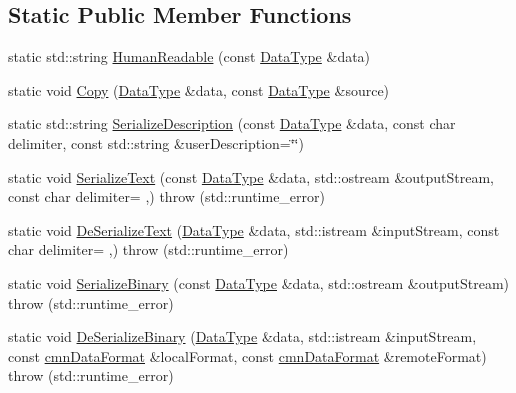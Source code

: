 \subsection*{Static Public Member Functions}
\begin{DoxyCompactItemize}
\item 
static std\+::string \hyperlink{classcmn_data_a486363e19d02f447104d14d3b9dcf2fa}{Human\+Readable} (const \hyperlink{classcmn_data_a353bd6bb0af651b6301e5e2e34587da2}{Data\+Type} \&data)
\item 
static void \hyperlink{classcmn_data_a0fcd362f10c5b31cf289f4fcd7ad3ea2}{Copy} (\hyperlink{classcmn_data_a353bd6bb0af651b6301e5e2e34587da2}{Data\+Type} \&data, const \hyperlink{classcmn_data_a353bd6bb0af651b6301e5e2e34587da2}{Data\+Type} \&source)
\item 
static std\+::string \hyperlink{classcmn_data_a31e9cd60cd1ff6ea665db60d90e3fbe1}{Serialize\+Description} (const \hyperlink{classcmn_data_a353bd6bb0af651b6301e5e2e34587da2}{Data\+Type} \&data, const char delimiter, const std\+::string \&user\+Description=\char`\"{}\char`\"{})
\item 
static void \hyperlink{classcmn_data_ad2b3503564e579511c78aaa891f864f5}{Serialize\+Text} (const \hyperlink{classcmn_data_a353bd6bb0af651b6301e5e2e34587da2}{Data\+Type} \&data, std\+::ostream \&output\+Stream, const char delimiter= \textquotesingle{},\textquotesingle{})  throw (std\+::runtime\+\_\+error)
\item 
static void \hyperlink{classcmn_data_a7daf61ca319d4f7835a856fb45741ef2}{De\+Serialize\+Text} (\hyperlink{classcmn_data_a353bd6bb0af651b6301e5e2e34587da2}{Data\+Type} \&data, std\+::istream \&input\+Stream, const char delimiter= \textquotesingle{},\textquotesingle{})  throw (std\+::runtime\+\_\+error)
\item 
static void \hyperlink{classcmn_data_a0b625171f6eb752525fb8c6cac5206f0}{Serialize\+Binary} (const \hyperlink{classcmn_data_a353bd6bb0af651b6301e5e2e34587da2}{Data\+Type} \&data, std\+::ostream \&output\+Stream)  throw (std\+::runtime\+\_\+error)
\item 
static void \hyperlink{classcmn_data_a26db3364e7ccd6296cc833c8ce060be1}{De\+Serialize\+Binary} (\hyperlink{classcmn_data_a353bd6bb0af651b6301e5e2e34587da2}{Data\+Type} \&data, std\+::istream \&input\+Stream, const \hyperlink{classcmn_data_format}{cmn\+Data\+Format} \&local\+Format, const \hyperlink{classcmn_data_format}{cmn\+Data\+Format} \&remote\+Format)  throw (std\+::runtime\+\_\+error)
\item 

\end{DoxyCompactItemize}
